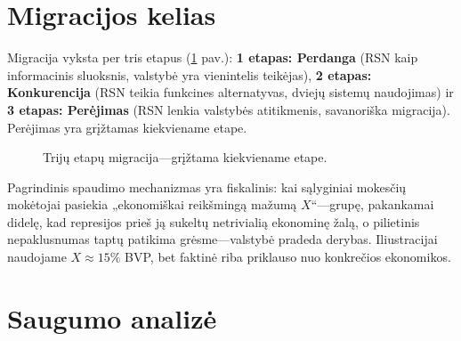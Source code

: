 \documentclass[11pt,a4paper,twocolumn]{article}
\begin{document}
\section{Migracijos kelias}

Migracija vyksta per tris etapus (\ref{fig:migration} pav.): \textbf{1 etapas: Perdanga} (RSN kaip informacinis sluoksnis, valstybė yra vienintelis teikėjas), \textbf{2 etapas: Konkurencija} (RSN teikia funkcines alternatyvas, dviejų sistemų naudojimas) ir \textbf{3 etapas: Perėjimas} (RSN lenkia valstybės atitikmenis, savanoriška migracija). Perėjimas yra grįžtamas kiekviename etape.

\begin{figure}[ht]
\centering
{}
\caption{Trijų etapų migracija---grįžtama kiekviename etape.}
\label{fig:migration}
\end{figure}

Pagrindinis spaudimo mechanizmas yra fiskalinis: kai sąlyginiai mokesčių mokėtojai pasiekia „ekonomiškai reikšmingą mažumą $X$“---grupę, pakankamai didelę, kad represijos prieš ją sukeltų netrivialią ekonominę žalą, o pilietinis nepaklusnumas taptų patikima grėsme---valstybė pradeda derybas. Iliustracijai naudojame $X \approx 15\%$ BVP, bet faktinė riba priklauso nuo konkrečios ekonomikos.

\section{Saugumo analizė}
\end{document}
